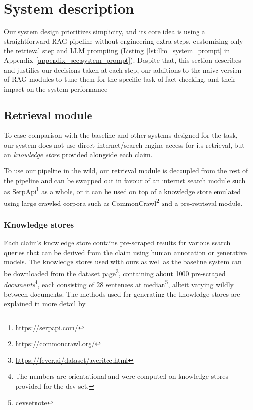\section{System description}
\label{sec:system}
{Our system design prioritizes simplicity, and its core idea is using a straightforward RAG pipeline without engineering extra steps, customizing only the retrieval step and LLM prompting } (Listing~\ref{lst:llm_system_prompt} {in Appendix~\ref{appendix_sec:system_prompt}}).
Despite that, this section describes and justifies our decisions taken at each step, our additions to the naive version of RAG modules to tune them for the specific task of fact-checking, and their impact on the system performance.

\subsection{Retrieval module}
\label{retrieval}
To ease comparison with the baseline and other systems designed for the task, our system does not use direct internet/search-engine access for its retrieval, but an \averitec{} \textit{knowledge store} provided alongside each claim.

{To use our pipeline in the wild, our retrieval module is decoupled from the rest of the pipeline and can be swapped out in favour of an internet search module such as SerpApi\footnote{\url{https://serpapi.com/}} as a whole, or it can be used on top of a knowledge store emulated using large crawled corpora such as CommonCrawl\footnote{\url{https://commoncrawl.org/}} and a pre-retrieval module.}

\subsubsection{Knowledge stores}
Each claim's knowledge store contains pre-scraped results for various search queries that can be derived from the claim using human annotation or generative models.
The knowledge stores used with ours as well as the baseline system can be downloaded from the \averitec{}  dataset page\footnote{\url{https://fever.ai/dataset/averitec.html}}, containing about 1000 pre-scraped \textit{documents}\footnote{\label{devsetnote}The numbers are orientational and were computed on knowledge stores provided for the \averitec{}  dev set.}, each consisting of $28$ sentences at median\footnote{devsetnote}, albeit varying wildly between documents.
The methods used for generating the knowledge stores are explained in more detail by~\cite{averitec2024}.

